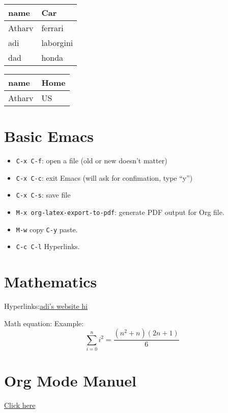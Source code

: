 \documentclass[11pt]{article}
\begin{document}
\begin{center}
\begin{tabular}{ll}
name & Car\\
\hline
Atharv & ferrari\\
adi & laborgini\\
dad & honda\\
\end{tabular}
\end{center}

\begin{center}
\begin{tabular}{ll}
name & Home\\
\hline
Atharv & US\\
\end{tabular}
\end{center}


\section{Basic Emacs}
\label{sec:org6f7a6fb}
\begin{itemize}
\item \texttt{C-x C-f}: open a file (old or new doesn't matter)
\item \texttt{C-x C-c}: exit Emacs (will ask for confimation, type ``y'')
\item \texttt{C-x C-s}: save file
\item \texttt{M-x org-latex-export-to-pdf}: generate PDF output for Org file.
\item \texttt{M-w} copy \texttt{C-y} paste.
\item \texttt{C-c C-l} Hyperlinks.
\end{itemize}

\section{Mathematics}
\label{sec:org3f066e5}

Hyperlinks:\href{https://nebhrajani-a.github.io/}{adi's website hi}

Math equation:
Example:
$$\sum_{i=0}^n i^2 = \frac{(n^2+n)(2n+1)}{6}$$

\section{Org Mode Manuel}
\label{sec:org2b34287}
\href{https://orgmode.org/manual/}{Click here}
\end{document}
